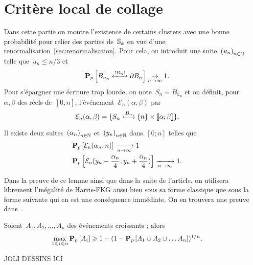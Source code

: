 \section{Critère local de collage}
Dans cette partie on montre l'existence de certains clusters avec une bonne probabilité pour relier des parties de~$\mathbb{S}_k$ en vue d'une renormalisation~\ref{sec:renormalisation}. Pour cela, on introduit une suite~$\suite{u}$ telle que~$u_n \leqslant n/3$ et %
	\[
		\Pp{\relie*[B_n]{B_{u_n}}{\partial B_n}} \underset{n \to \infty}{\to} 1.
	\] 
	Pour s'épargner une écriture trop lourde, on note~$S_n = B_{u_n}$  et on définit, pour~$\alpha, \beta$ des réels de~$[0, n]$, l'événement~$\mathcal{E}_n(\alpha, \beta)$  par
	\[
		\mathcal{E}_n( \alpha, \beta ) = \{\relie[B_n]{S_n}{\{n\} \times \llbracket \alpha ; \beta \rrbracket} \}.
	\]
	
	\begin{lem}\label{lem:collagesElem} 
		Il existe deux suites~$\suite{\alpha}$ et~$\suite{y}$ dans~$[0; n]$ telles que
		\begin{align*}
			  &\bm{\mathrm{P}}_{p}\left[\mathcal{E}_n(\alpha_n, n)\right] \xrightarrow[n\to\infty]{} 1 \\ 
			  &\bm{\mathrm{P}}_{p}\left[\mathcal{E}_n(y_n - \frac{\alpha_n}{4}, y_n + \frac{\alpha_n}{4})\right] \xrightarrow[n \to \infty]{} 1.
		\end{align*}
	\end{lem}
	Dans la preuve de ce lemme ainsi que dans la suite de l'article, on utilisera librement l'inégalité de Harris-FKG aussi bien sous sa forme classique que sous la forme suivante qui en est une conséquence immédiate. On en trouvera une preuve dans~\cite{Grimmett}. 
	\begin{lem}\label{lem:HarrisFKG}
		Soient~$A_1, A_2, \ldots, A_n$ des événements croissants ; alors
		\[
			\max_{1 \leqslant i \leqslant n} \bm{\mathrm{P}}_{p}\left[A_i\right] \geqslant 1 - (1 - \bm{\mathrm{P}}_{p}\left[A_1 \cup A_2 \cup \ldots A_n\right])^{1/n}. 
		\]
	\end{lem}
	
	JOLI DESSINS ICI %

